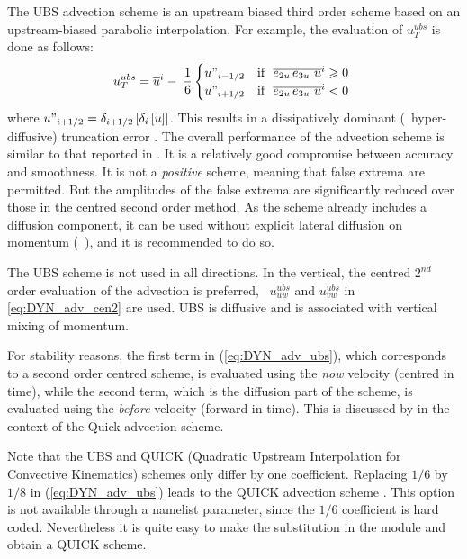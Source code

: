 \documentclass[../main/NEMO_manual]{subfiles}
\begin{document}
The UBS advection scheme is an upstream biased third order scheme based on
an upstream-biased parabolic interpolation.
For example, the evaluation of $u_T^{ubs} $ is done as follows:
\begin{equation}
  \label{eq:DYN_adv_ubs}
  u_T^{ubs} =\overline u ^i-\;\frac{1}{6}
  \begin{cases}
    u"_{i-1/2}& 	\text{if $\ \overline{e_{2u}\,e_{3u} \ u}^i  \geqslant 0$ } 	\\
    u"_{i+1/2}& 	\text{if $\ \overline{e_{2u}\,e_{3u} \ u}^i  < 0$ }
  \end{cases}
\end{equation}
where $u"_{i+1/2} =\delta_{i+1/2} \left[ {\delta_i \left[ u \right]} \right]$.
This results in a dissipatively dominant (\ie\ hyper-diffusive) truncation error
\citep{shchepetkin.mcwilliams_OM05}.
The overall performance of the advection scheme is similar to that reported in \citet{farrow.stevens_JPO95}.
It is a relatively good compromise between accuracy and smoothness.
It is not a \emph{positive} scheme, meaning that false extrema are permitted.
But the amplitudes of the false extrema are significantly reduced over those in the centred second order method.
As the scheme already includes a diffusion component, it can be used without explicit lateral diffusion on momentum
(\ie\ ),
and it is recommended to do so.

The UBS scheme is not used in all directions.
In the vertical, the centred $2^{nd}$ order evaluation of the advection is preferred, \ie\ $u_{uw}^{ubs}$ and
$u_{vw}^{ubs}$ in \autoref{eq:DYN_adv_cen2} are used.
UBS is diffusive and is associated with vertical mixing of momentum. 

For stability reasons, the first term in (\autoref{eq:DYN_adv_ubs}),
which corresponds to a second order centred scheme, is evaluated using the \textit{now} velocity (centred in time),
while the second term, which is the diffusion part of the scheme,
is evaluated using the \textit{before} velocity (forward in time).
This is discussed by \citet{webb.de-cuevas.ea_JAOT98} in the context of the Quick advection scheme.

Note that the UBS and QUICK (Quadratic Upstream Interpolation for Convective Kinematics) schemes only differ by
one coefficient.
Replacing $1/6$ by $1/8$ in (\autoref{eq:DYN_adv_ubs}) leads to the QUICK advection scheme \citep{webb.de-cuevas.ea_JAOT98}.
This option is not available through a namelist parameter, since the $1/6$ coefficient is hard coded.
Nevertheless it is quite easy to make the substitution in the  module and obtain a QUICK scheme.
\end{document}
